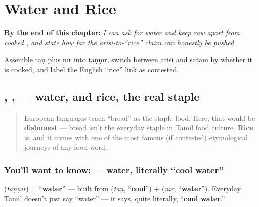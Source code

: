 
\chapter{Water and Rice}
\label{ch:ta-water-and-rice}

\begin{chapteropening}
\textbf{By the end of this chapter:} \emph{I can ask for water and keep raw  apart from cooked , and state how far the arisi-to-\textquotedblleft{}rice\textquotedblright{} claim can honestly be pushed.}

Assemble taṇ plus nīr into taṇṇīr, switch between arisi and sātam by whether it is cooked, and label the English \textquotedblleft{}rice\textquotedblright{} link as contested.
\end{chapteropening}

\section[\texorpdfstring{\ta{தண்ணீர்} \ta{அரிசி} \ta{சாதம்} (taṇṇīr arisi sātam)}{தண்ணீர் அரிசி சாதம் (taṇṇīr arisi sātam)}]{, ,  — water, and rice, the real staple}

\label{lesson:TA-C15-thanneer-arisi}



\begin{quote}
European languages teach \textquotedblleft{}bread\textquotedblright{} as the staple food. Here, that would be \textbf{dishonest} — bread isn't the everyday staple in Tamil food culture. \textbf{Rice} is, and it comes with one of the most famous (if contested) etymological journeys of any food-word.
\end{quote}

\subsection*{You'll want to know:  — water, literally \textquotedblleft{}cool water\textquotedblright{}}
\textbf{} (\emph{taṇṇīr}) = \textquotedblleft{}\textbf{water}\textquotedblright{} — built from \textbf{} (\emph{taṇ}, \textquotedblleft{}\textbf{cool}\textquotedblright{}) + \textbf{} (\emph{nīr}, \textquotedblleft{}\textbf{water}\textquotedblright{}). Everyday Tamil doesn't just say \textquotedblleft{}water\textquotedblright{} — it says, quite literally, \textquotedblleft{}\textbf{cool water}.\textquotedblright{}

